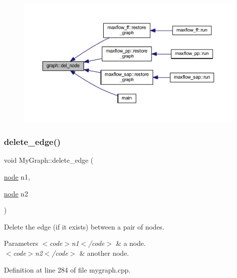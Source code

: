\nopagebreak
\begin{figure}[H]
\begin{center}
\leavevmode
\includegraphics[width=350pt]{classgraph_a8bdc09d5b9ac4bd26586b054d8fcbe91_icgraph}
\end{center}
\end{figure}
\mbox{\label{class_my_graph_a4070383c56ef8f54e9fdc595d65b89de}} 
\subsubsection{\texorpdfstring{delete\+\_\+edge()}{delete\_edge()}}
{\footnotesize\ttfamily void My\+Graph\+::delete\+\_\+edge (\begin{DoxyParamCaption}\item[{\mbox{\hyperlink{classnode}{node}}}]{n1,  }\item[{\mbox{\hyperlink{classnode}{node}}}]{n2 }\end{DoxyParamCaption})\hspace{0.3cm}{\ttfamily [virtual]}}

Delete the edge (if it exists) between a pair of nodes.


\begin{DoxyParams}{Parameters}
{\em $<$code$>$n1$<$/code$>$} & a node. \\
\hline
{\em $<$code$>$n2$<$/code$>$} & another node. \\
\hline
\end{DoxyParams}


Definition at line 284 of file mygraph.\+cpp.


